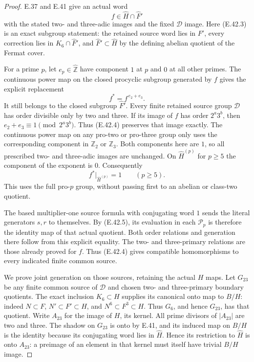 \begin{proof}
E.37 and E.41 give an actual word
\[
             f\in\widehat H\cap\widehat F'
 \tag{E.42.3}
\]
with the stated two- and three-adic images
and the fixed $\mathscr D$ image.
Here \textup{(E.42.3)} is an exact subgroup
statement: the retained source word lies
in $F'$, every correction lies in
$K_6\cap\widehat F'$, and
$\widehat F'\subset\widehat H$ by the
defining abelian quotient of the Fermat
cover.

For a prime $p$, let $e_p\in\widehat{\mathbb Z}$
have component $1$ at $p$ and $0$ at all
other primes.  The continuous power map
on the closed procyclic subgroup generated
by $f$ gives the explicit replacement
\[
                       f^\ast=f^{\,e_2+e_3}.
 \tag{E.42.4}
\]
It still belongs to the closed subgroup
$\widehat F'$.
Every finite retained source group
$\mathscr D$ has order divisible only by
two and three.  If its image of $f$ has
order $2^a3^b$, then
$e_2+e_3\equiv1\pmod{2^a3^b}$.
Thus \textup{(E.42.4)} preserves that
image exactly.
The continuous power map on any pro-two
or pro-three group only uses the corresponding
component in $\mathbb Z_2$ or $\mathbb Z_3$.
Both components here are $1$, so all
prescribed two- and three-adic images
are unchanged.
On $\widehat H^{(p)}$ for $p\ge5$ the
component of the exponent is $0$.
Consequently
\[
              f^\ast\big|_{\widehat H^{(p)}}=1
                            \qquad(p\ge5).
 \tag{E.42.5}
\]
This uses the full pro-$p$ group, without
passing first to an abelian or class-two
quotient.

The based multiplier-one source formula
with conjugating word $1$ sends the
literal generators $s,r$ to themselves.
By \textup{(E.42.5)}, its evaluation in
each $\mathscr P_p$ is therefore the
identity map of that actual quotient.
Both order relations and generation there
follow from this explicit equality.
The two- and three-primary relations are
those already proved for $f$.
Thus \textup{(E.42.4)} gives compatible
homomorphisms to every indicated finite
common source.

We prove joint generation on those sources,
retaining the actual $H$ maps.
Let $G_{23}$ be any finite common source
of $\mathscr D$ and chosen two- and
three-primary boundary quotients.
The exact inclusion $K_6\subset H$ supplies its
canonical onto map to $B/H$: indeed $N\subset F$,
$N'\subset F'\subset H$, and $N^6\subset F^3\subset H$.
Thus $G_6$, and hence $G_{23}$, has that quotient.
Write
$A_{23}$ for the image of $H$, its kernel.
All prime divisors of $|A_{23}|$ are two
and three.
The shadow on $G_{23}$ is onto by E.41,
and its induced map on $B/H$ is the
identity because its conjugating word
lies in $\widehat H$.
Hence its restriction to $\widehat H$
is onto $A_{23}$: a preimage of an
element in that kernel must itself
have trivial $B/H$ image.


\end{proof}

